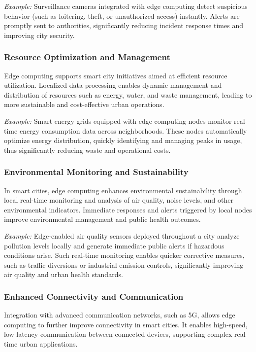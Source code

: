 \documentclass[runningheads]{llncs}
\begin{document}
\textit{Example:} Surveillance cameras integrated with edge computing detect suspicious behavior (such as loitering, theft, or unauthorized access) instantly. Alerts are promptly sent to authorities, significantly reducing incident response times and improving city security.

\subsubsection{Resource Optimization and Management}
Edge computing supports smart city initiatives aimed at efficient resource utilization. Localized data processing enables dynamic management and distribution of resources such as energy, water, and waste management, leading to more sustainable and cost-effective urban operations.

\textit{Example:} Smart energy grids equipped with edge computing nodes monitor real-time energy consumption data across neighborhoods. These nodes automatically optimize energy distribution, quickly identifying and managing peaks in usage, thus significantly reducing waste and operational costs.

\subsubsection{Environmental Monitoring and Sustainability}
In smart cities, edge computing enhances environmental sustainability through local real-time monitoring and analysis of air quality, noise levels, and other environmental indicators. Immediate responses and alerts triggered by local nodes improve environmental management and public health outcomes.

\textit{Example:} Edge-enabled air quality sensors deployed throughout a city analyze pollution levels locally and generate immediate public alerts if hazardous conditions arise. Such real-time monitoring enables quicker corrective measures, such as traffic diversions or industrial emission controls, significantly improving air quality and urban health standards.

\subsubsection{Enhanced Connectivity and Communication}
Integration with advanced communication networks, such as 5G, allows edge computing to further improve connectivity in smart cities. It enables high-speed, low-latency communication between connected devices, supporting complex real-time urban applications.
\end{document}
